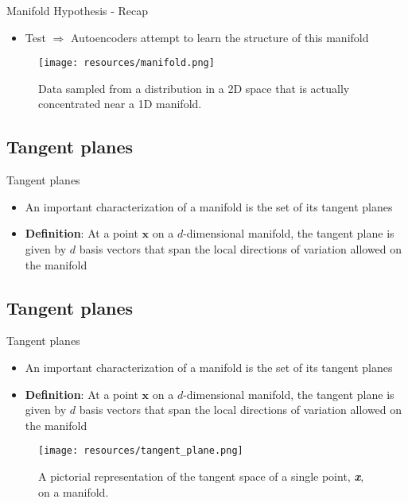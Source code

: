 \documentclass[handout]{beamer}
\begin{document}
\begin{frame}[t]{Manifold Hypothesis - Recap}
    \begin{itemize}
    	\item Test
        $\Rightarrow$ Autoencoders attempt to learn the structure of this manifold \\
    \end{itemize}    
            \vspace{.5cm}
            \begin{figure}[h]
                \centering
                \texttt{[image: resources/manifold.png]}
                \caption{Data sampled from a distribution in a 2D space that is actually concentrated near a 1D manifold.}
            \end{figure}
\end{frame}

\subsection{Tangent planes}
\begin{frame}[t]{Tangent planes}
\begin{itemize}
    \pause
    \item An important characterization of a manifold is the set of its tangent planes
        \pause
    \item \textbf{Definition}: At a point $\pmb{x}$ on a $d$-dimensional manifold, the tangent plane is given by $d$ basis vectors that span the local directions of variation allowed on the manifold
    
\end{itemize} 
\end{frame}

\subsection{Tangent planes}
\begin{frame}[t]{Tangent planes}
\begin{itemize}
    \item An important characterization of a manifold is the set of its tangent planes
    \item \textbf{Definition}: At a point $\pmb{x}$ on a $d$-dimensional manifold, the tangent plane is given by $d$ basis vectors that span the local directions of variation allowed on the manifold
    
\end{itemize} 
        \begin{figure}[h]
            \centering
            \texttt{[image: resources/tangent\_plane.png]}
            \caption{A pictorial representation of the tangent space of a single point, \textbf{\textit{x}}, on a manifold.}
        \end{figure}
\end{frame}
\end{document}
